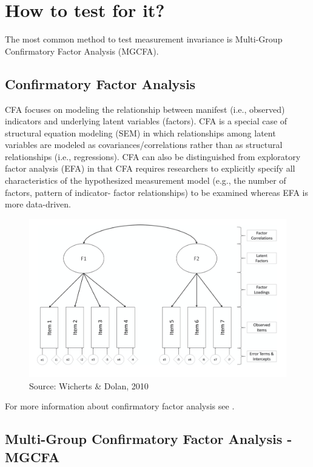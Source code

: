 \documentclass[
]{book}
\begin{document}
\hypertarget{how-to-test-for-it}{%
\section{How to test for it?}\label{how-to-test-for-it}}

The most common method to test measurement invariance is Multi-Group Confirmatory Factor Analysis (MGCFA).

\hypertarget{confirmatory-factor-analysis}{%
\subsection{Confirmatory Factor Analysis}\label{confirmatory-factor-analysis}}

CFA focuses on modeling the relationship between manifest (i.e., observed) indicators and underlying latent variables (factors). CFA is a special case of structural equation modeling (SEM) in which relationships among latent variables are modeled as covariances/correlations rather than as structural relationships (i.e., regressions). CFA can also be distinguished from exploratory factor analysis (EFA) in that CFA requires researchers to explicitly specify all characteristics of the hypothesized measurement model (e.g., the number of factors, pattern of indicator- factor relationships) to be examined whereas EFA is more data-driven.

\begin{figure}
\includegraphics[width=0.8\linewidth]{confactor} \caption{Source: Wicherts & Dolan, 2010}\label{fig:cfa}
\end{figure}

For more information about confirmatory factor analysis see \citet{Brown2015}.

\hypertarget{multi-group-confirmatory-factor-analysis---mgcfa}{%
\subsection{Multi-Group Confirmatory Factor Analysis - MGCFA}\label{multi-group-confirmatory-factor-analysis---mgcfa}}
\end{document}
